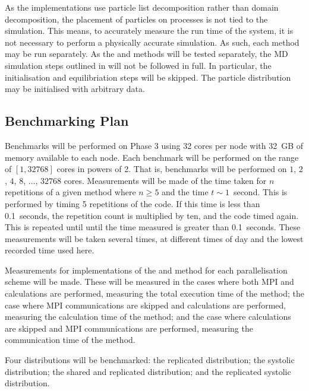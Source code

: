 %
As the implementations use particle list decomposition rather
than domain decomposition, the placement of particles on
processes is not tied to the simulation.
%
This means, to accurately measure the run time of the system,
it is not necessary to perform a physically accurate simulation.
%
As such, each method may be run separately.
%
As the \individualoperation{} and \pairoperation{} methods will
be tested separately, the MD simulation steps outlined in
will not be followed in full.
%
In particular, the initialisation and equilibriation steps will
be skipped.
%
The particle distribution may be initialised with arbitrary data.


\subsection{Benchmarking Plan}

Benchmarks will be performed on \hector{} Phase 3 using
32 cores per node with 32~GB of memory available to each node.
%
Each benchmark will be performed on the range of $[1,32768]$ cores
in powers of 2.
%
That is, benchmarks will be performed on
$1$, $2$, $4$, $8$, $\dots{}$, $32768$ cores.
%
Measurements will be made of the time taken for $n$ repetitions of a given
method where $n \ge{} 5$ and the time $t \sim{} 1$~second.
%
This is performed by timing 5 repetitions of the code.
%
If this time is less than 0.1~seconds, the repetition count is
multiplied by ten, and the code timed again.
%
This is repeated until until the time measured is greater than 0.1~seconds.
%
These measurements will be taken several times, at different times of
day and the lowest recorded time used here.

Measurements for implementations of
the \individualoperation{} and \pairoperation{} method
for each parallelisation scheme will be made.
%
These will be measured in the cases where both MPI and calculations
are performed, measuring the total execution time of the method;
the case where MPI communications are skipped and calculations are
performed, measuring the calculation time of the method; and
the case where calculations are skipped and MPI communications are
performed, measuring the communication time of the method.

Four distributions will be benchmarked:
%
the replicated distribution; the systolic distribution;
the shared and replicated distribution; and
the replicated systolic distribution.

